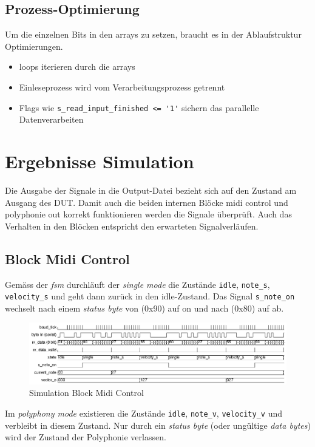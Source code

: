 \subsection{Prozess-Optimierung}

Um die einzelnen Bits in den arrays zu setzen, braucht es in der Ablaufstruktur Optimierungen.

\begin{itemize}
	\item loops iterieren durch die arrays
	\item Einleseprozess wird vom Verarbeitungsprozess getrennt
	\item Flags wie \lstinline|s_read_input_finished <= '1'| sichern das parallelle Datenverarbeiten
\end{itemize}

\section{Ergebnisse Simulation}\label{sec.ergebnisse_tests}
Die Ausgabe der Signale in die Output-Datei bezieht sich auf den Zustand am Ausgang des DUT. Damit auch die beiden internen Blöcke midi control und polyphonie out korrekt funktionieren werden die Signale überprüft. Auch das Verhalten in den Blöcken entspricht den erwarteten Signalverläufen.\\

\subsection{Block Midi Control}
Gemäss der \textit{fsm} durchläuft der \textit{single mode}  die Zustände \lstinline|idle|, \lstinline|note_s|, \lstinline|velocity_s| und geht dann zurück  in den idle-Zustand. Das Signal \lstinline|s_note_on| wechselt nach einem \textit{status byte} von (0x90) auf on und nach (0x80) auf ab.
\begin{figure}[H]
	\includegraphics[width=1\textwidth]{images/midi_control/wave_single.png}
	\caption{Simulation Block Midi Control}
	\label{fig.test_midi:control_single}
\end{figure} 

Im \textit{polyphony mode} existieren die Zustände \lstinline|idle|, \lstinline|note_v|, \lstinline|velocity_v| und verbleibt in diesem Zustand. Nur durch ein \textit{status byte} (oder ungültige \textit{data bytes}) wird der Zustand der Polyphonie verlassen.

